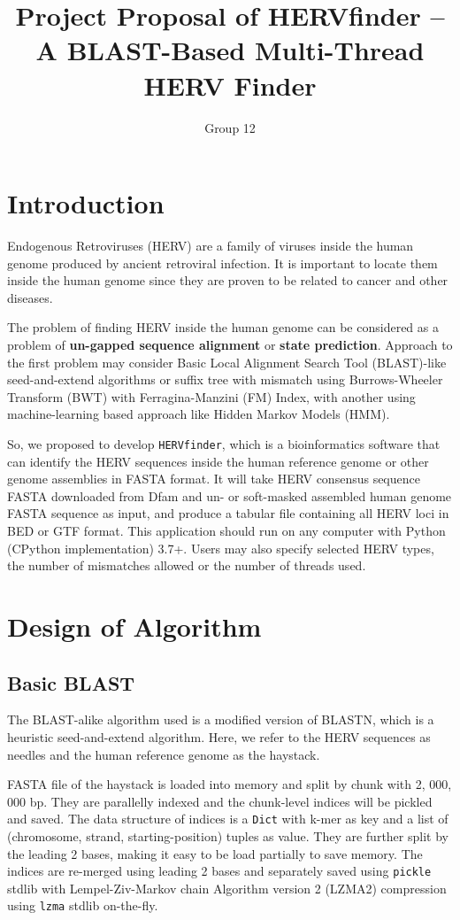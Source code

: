 \documentclass[9pt,final,journal,twocolumn,a4paper]{IEEEtran}
\title{Project Proposal of HERVfinder -- A BLAST-Based Multi-Thread HERV Finder}
\author{Group 12}
\begin{document}
\sloppy{}\flushbottom\maketitle
\section{Introduction}

 Endogenous Retroviruses (HERV) are a family of viruses inside the human genome produced by ancient retroviral infection. It is important to locate them inside the human genome since they are proven to be related to cancer and other diseases.

The problem of finding HERV inside the human genome can be considered as a problem of \textbf{un-gapped sequence alignment} or \textbf{state prediction}. Approach to the first problem may consider Basic Local Alignment Search Tool (BLAST)-like seed-and-extend algorithms or suffix tree with mismatch using Burrows-Wheeler Transform (BWT) with Ferragina-Manzini (FM) Index, with another using machine-learning based approach like Hidden Markov Models (HMM).

So, we proposed to develop \verb|HERVfinder|, which is a bioinformatics software that can identify the HERV sequences inside the human reference genome or other genome assemblies in FASTA format. It will take HERV consensus sequence FASTA downloaded from Dfam and un- or soft-masked assembled human genome FASTA sequence as input, and produce a tabular file containing all HERV loci in BED or GTF format. This application should run on any computer with Python (CPython implementation) 3.7+. Users may also specify selected HERV types, the number of mismatches allowed or the number of threads used.


\section{Design of Algorithm}

\subsection{Basic BLAST}

The BLAST-alike algorithm used is a modified version of BLASTN, which is a heuristic seed-and-extend algorithm. Here, we refer to the HERV sequences as needles and the human reference genome as the haystack.

FASTA file of the haystack is loaded into memory and split by chunk with 2, 000, 000 bp. They are parallelly indexed and the chunk-level indices will be pickled and saved. The data structure of indices is a \verb|Dict| with k-mer as key and a list of (chromosome, strand, starting-position) tuples as value. They are further split by the leading 2 bases, making it easy to be load partially to save memory. The indices are re-merged using leading 2 bases and separately saved using \verb|pickle| stdlib with Lempel-Ziv-Markov chain Algorithm version 2 (LZMA2) compression using \verb|lzma| stdlib on-the-fly.
\end{document}
